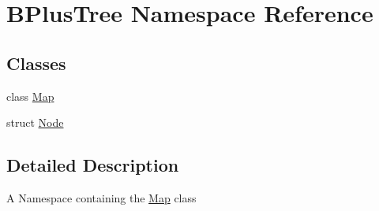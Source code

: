 \hypertarget{namespace_b_plus_tree}{}\section{B\+Plus\+Tree Namespace Reference}
\label{namespace_b_plus_tree}
\subsection*{Classes}
\begin{DoxyCompactItemize}
\item 
class \hyperlink{class_b_plus_tree_1_1_map}{Map}
\item 
struct \hyperlink{struct_b_plus_tree_1_1_node}{Node}
\end{DoxyCompactItemize}


\subsection{Detailed Description}
A Namespace containing the \hyperlink{class_b_plus_tree_1_1_map}{Map} class 